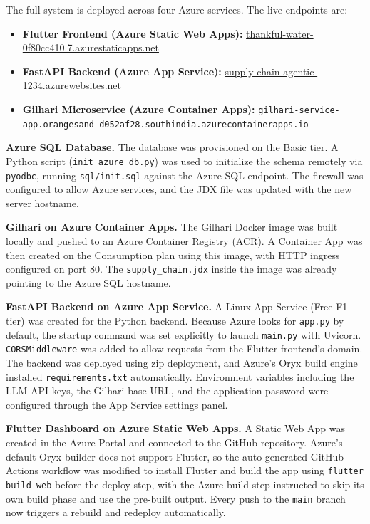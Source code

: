 \documentclass{book}
\begin{document}
The full system is deployed across four Azure services. The live endpoints are:
\begin{itemize}[itemsep=0pt]
\item \textbf{Flutter Frontend (Azure Static Web Apps):} \href{https://thankful-water-0f80cc410.7.azurestaticapps.net/}{thankful-water-0f80cc410.7.azurestaticapps.net}
\item \textbf{FastAPI Backend (Azure App Service):} \href{https://supply-chain-agentic-1234.azurewebsites.net/docs}{supply-chain-agentic-1234.azurewebsites.net}
\item \textbf{Gilhari Microservice (Azure Container Apps):} \texttt{gilhari-service-app.orangesand-d052af28.southindia.azurecontainerapps.io}
\end{itemize}

\textbf{Azure SQL Database.} The database was provisioned on the Basic tier. A Python script (\texttt{init\_azure\_db.py}) was used to initialize the schema remotely via \texttt{pyodbc}, running \texttt{sql/init.sql} against the Azure SQL endpoint. The firewall was configured to allow Azure services, and the JDX file was updated with the new server hostname.

\textbf{Gilhari on Azure Container Apps.} The Gilhari Docker image was built locally and pushed to an Azure Container Registry (ACR). A Container App was then created on the Consumption plan using this image, with HTTP ingress configured on port 80. The \texttt{supply\_chain.jdx} inside the image was already pointing to the Azure SQL hostname.

\textbf{FastAPI Backend on Azure App Service.} A Linux App Service (Free F1 tier) was created for the Python backend. Because Azure looks for \texttt{app.py} by default, the startup command was set explicitly to launch \texttt{main.py} with Uvicorn. \texttt{CORSMiddleware} was added to allow requests from the Flutter frontend's domain. The backend was deployed using zip deployment, and Azure's Oryx build engine installed \texttt{requirements.txt} automatically. Environment variables including the LLM API keys, the Gilhari base URL, and the application password were configured through the App Service settings panel.

\textbf{Flutter Dashboard on Azure Static Web Apps.} A Static Web App was created in the Azure Portal and connected to the GitHub repository. Azure's default Oryx builder does not support Flutter, so the auto-generated GitHub Actions workflow was modified to install Flutter and build the app using \texttt{flutter build web} before the deploy step, with the Azure build step instructed to skip its own build phase and use the pre-built output. Every push to the \texttt{main} branch now triggers a rebuild and redeploy automatically.
\end{document}
